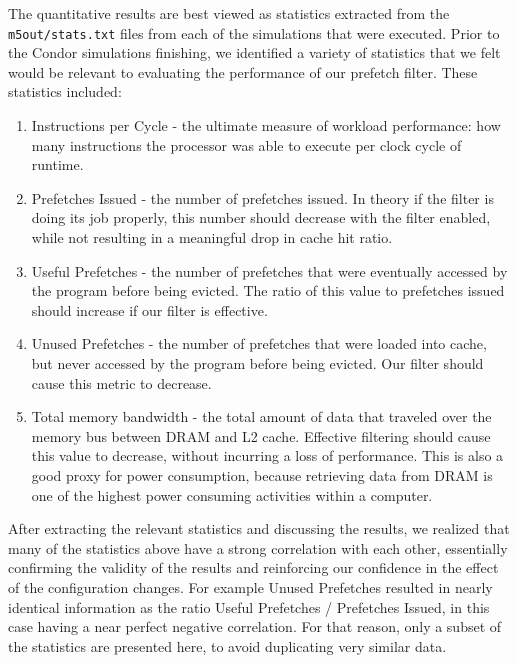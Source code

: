 \documentclass[10pt,conference]{IEEEtran}
\begin{document}
The quantitative results are best viewed as statistics extracted from the \texttt{m5out/stats.txt} files from each of the simulations that were executed. Prior to the Condor simulations finishing, we identified a variety of statistics that we felt would be relevant to evaluating the performance of our prefetch filter. These statistics included:
\begin{enumerate}
    \item Instructions per Cycle - the ultimate measure of workload performance: how many instructions the processor was able to execute per clock cycle of runtime.
    \item Prefetches Issued - the number of prefetches issued. In theory if the filter is doing its job properly, this number should decrease with the filter enabled, while not resulting in a meaningful drop in cache hit ratio.
    \item Useful Prefetches  - the number of prefetches that were eventually accessed by the program before being evicted. The ratio of this value to prefetches issued should increase if our filter is effective.
    \item Unused Prefetches  - the number of prefetches that were loaded into cache, but never accessed by the program before being evicted. Our filter should cause this metric to decrease.
    \item Total memory bandwidth  - the total amount of data that traveled over the memory bus between DRAM and L2 cache. Effective filtering should cause this value to decrease, without incurring a loss of performance. This is also a good proxy for power consumption, because retrieving data from DRAM is one of the highest power consuming activities within a computer. 
\end{enumerate}

After extracting the relevant statistics and discussing the results, we realized that many of the statistics above have a strong correlation with each other, essentially confirming the validity of the results and reinforcing our confidence in the effect of the configuration changes. For example Unused Prefetches resulted in nearly identical information as the ratio Useful Prefetches / Prefetches Issued, in this case having a near perfect negative correlation. For that reason, only a subset of the statistics are presented here, to avoid duplicating very similar data.
\end{document}

